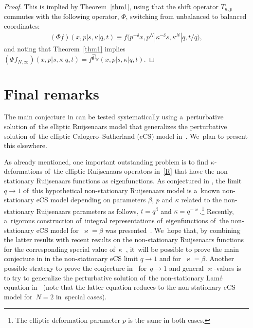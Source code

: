 \documentclass[pdftex]{sigma}%
\numberwithin{equation}{section}
\begin{document}
\begin{proof}This is implied by Theorem~\ref{thm1}, using that the shift operator $T_{\kappa,p}$ commutes with the following operator, $\Phi$, switching from unbalanced to balanced coordinates:
\begin{gather*}
(\Phi f)(x,p|s,\kappa|q,t)\equiv f\big(p^{-\delta}x,p^N|\kappa^{-\delta}s,\kappa^{N}|q,t/q\big),
\end{gather*}
and noting that Theorem~\ref{thm1} implies $(\Phi f_{N,\infty})(x,p|s,\kappa|q,t)= f^{\widehat{\mathfrak{gl}}_N}(x,p|s,\kappa|q,t)$.
\end{proof}

\section{Final remarks}\label{sec:remarks}

The main conjecture in \cite[Conjecture~1.14]{S} can be tested systematically using a~perturbative solution of~the elliptic Ruijsenaars model that generalizes the perturbative solution of~the elliptic Calogero--Sutherland (eCS) model in~\cite{L3}.
We~plan to present this elsewhere.

As already mentioned, one important outstanding problem is to find $\kappa$-deformations of~the elliptic Ruijsenaars operators in~\eqref{R} that have the non-stationary Ruijsenaars functions as eigenfunctions. As conjectured in \cite{S}, the limit $q\to 1$ of~this hypothetical non-stationary Ruijsenaars model is a~known non-stationary eCS model depending on parameters $\beta$, $p$ and $\kappa$ related to the non-stationary Ruijsenaars parameters as follows, $t=q^\beta$ and $\kappa=q^{-\varkappa}$.\footnote{The elliptic deformation parameter $p$ is the same in both cases.} Recently, a~rigorous construction of~integral representations of~eigenfunctions of~the non-stationary eCS model for~$\varkappa=\beta$ was presented~\cite{AL2}. We~hope that, by combining the latter results with recent results on the non-stationary Ruijsenaars functions for the corresponding special value of~$\kappa$~\cite{FOS}, it~will be possible to prove the main conjecture in \cite{S} in the non-stationary eCS limit $q\to 1$ and for~$\varkappa=\beta$.
Another possible strategy to prove the conjecture in~\cite{S} for~$q\to 1$ and general $\varkappa$-values is to try to generalize the perturbative solution of~the non-stationary Lam\'e equation in~\cite{AL1} (note that the latter equation reduces to the non-stationary eCS model for~$N=2$ in~special cases).
\end{document}
